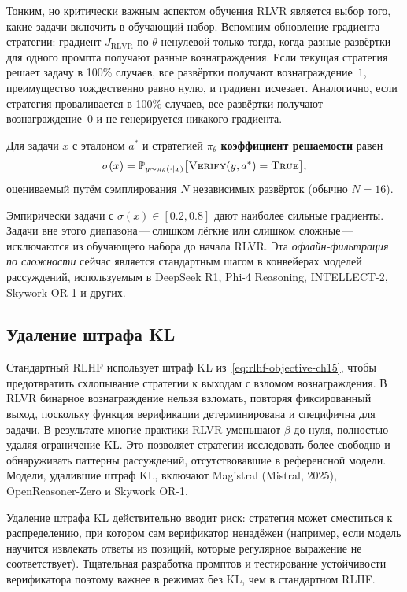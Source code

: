 Тонким, но критически важным аспектом обучения RLVR является выбор того, какие
задачи включить в обучающий набор. Вспомним обновление градиента стратегии:
градиент $J_{\mathrm{RLVR}}$ по $\theta$
ненулевой только тогда, когда разные развёртки для одного промпта получают
разные вознаграждения. Если текущая стратегия решает задачу в 100\% случаев,
все развёртки получают вознаграждение~$1$, преимущество тождественно
равно нулю, и градиент исчезает. Аналогично, если стратегия проваливается в 100\%
случаев, все развёртки получают вознаграждение~$0$ и не генерируется никакого градиента.

\begin{definition}
\label{def:solvability}
Для задачи $x$ с эталоном $a^*$ и стратегией $\pi_\theta$
\textbf{коэффициент решаемости} равен
\[
\sigma(x) = \mathbb{P}_{y \sim \pi_\theta(\cdot|x)}
            \bigl[\textsc{Verify}(y, a^*) = \textsc{True}\bigr],
\]
оцениваемый путём сэмплирования $N$ независимых развёрток (обычно $N = 16$).
\end{definition}

Эмпирически задачи с $\sigma(x) \in [0.2, 0.8]$ дают
наиболее сильные градиенты. Задачи вне этого диапазона\,---\,слишком лёгкие или
слишком сложные\,---\,исключаются из обучающего набора до начала RLVR.
Эта \emph{офлайн-фильтрация по сложности} сейчас является стандартным
шагом в конвейерах моделей рассуждений, используемым в DeepSeek R1, Phi-4
Reasoning, INTELLECT-2, Skywork OR-1 и других.

\subsection{Удаление штрафа KL}
\label{subsec:no-kl}

Стандартный RLHF использует штраф KL из~\eqref{eq:rlhf-objective-ch15}, чтобы
предотвратить схлопывание стратегии к выходам с взломом вознаграждения. В
RLVR бинарное вознаграждение нельзя взломать, повторяя фиксированный выход,
поскольку функция верификации детерминирована и специфична для задачи.
В результате многие практики RLVR уменьшают $\beta$ до нуля, полностью удаляя
ограничение KL. Это позволяет стратегии исследовать более свободно
и обнаруживать паттерны рассуждений, отсутствовавшие в
референсной модели. Модели, удалившие штраф KL, включают
Magistral (Mistral, 2025), OpenReasoner-Zero и Skywork OR-1.

\begin{remark}
Удаление штрафа KL действительно вводит риск: стратегия может сместиться
к распределению, при котором сам верификатор ненадёжен (например,
если модель научится извлекать ответы из позиций, которые регулярное
выражение не соответствует). Тщательная разработка промптов и тестирование
устойчивости верификатора поэтому важнее в режимах без KL, чем в
стандартном RLHF.
\end{remark}

